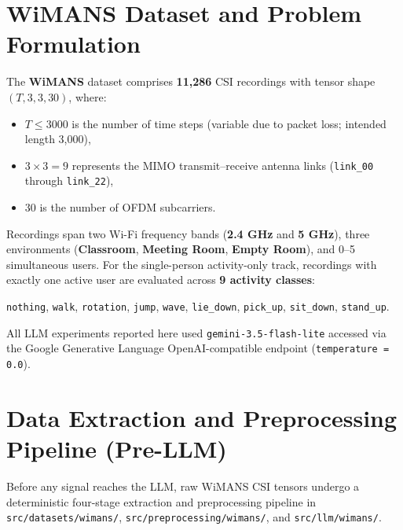 \documentclass[11pt,a4paper]{article}
\begin{document}
\section{WiMANS Dataset and Problem Formulation}
The \textbf{WiMANS} dataset comprises \textbf{11,286} CSI recordings with tensor shape $(T, 3, 3, 30)$, where:
\begin{itemize}
    \item $T \le 3000$ is the number of time steps (variable due to packet loss; intended length 3,000),
    \item $3 \times 3 = 9$ represents the MIMO transmit--receive antenna links (\texttt{link\_00} through \texttt{link\_22}),
    \item $30$ is the number of OFDM subcarriers.
\end{itemize}
Recordings span two Wi-Fi frequency bands (\textbf{2.4 GHz} and \textbf{5 GHz}), three environments (\textbf{Classroom}, \textbf{Meeting Room}, \textbf{Empty Room}), and 0--5 simultaneous users. For the single-person activity-only track, recordings with exactly one active user are evaluated across \textbf{9 activity classes}:
\begin{center}
\texttt{nothing}, \texttt{walk}, \texttt{rotation}, \texttt{jump}, \texttt{wave}, \texttt{lie\_down}, \texttt{pick\_up}, \texttt{sit\_down}, \texttt{stand\_up}.
\end{center}
All LLM experiments reported here used \texttt{gemini-3.5-flash-lite} accessed via the Google Generative Language OpenAI-compatible endpoint (\texttt{temperature = 0.0}).

\section{Data Extraction and Preprocessing Pipeline (Pre-LLM)}
Before any signal reaches the LLM, raw WiMANS CSI tensors undergo a deterministic four-stage extraction and preprocessing pipeline in \texttt{src/datasets/wimans/}, \texttt{src/preprocessing/wimans/}, and \texttt{src/llm/wimans/}.
\end{document}
